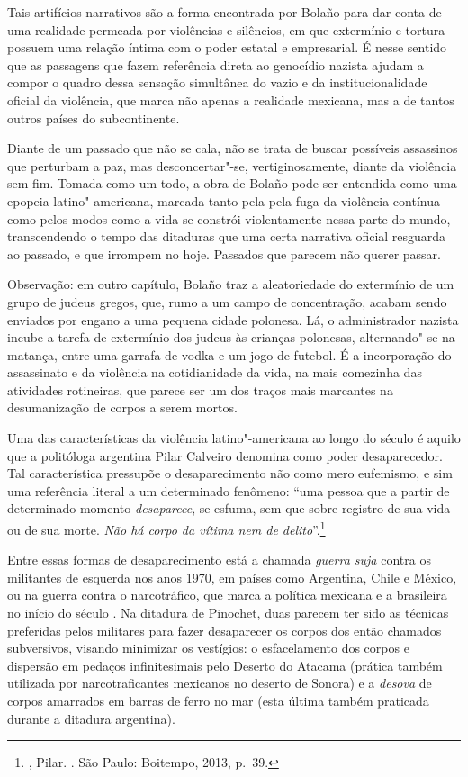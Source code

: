 Tais artifícios narrativos são a forma encontrada por Bolaño para dar
conta de uma realidade permeada por violências e silêncios, em que
extermínio e tortura possuem uma relação íntima com o poder estatal e
empresarial. É nesse sentido que as passagens que fazem referência
direta ao genocídio nazista ajudam a compor o quadro dessa sensação
simultânea do vazio e da institucionalidade oficial da violência, que
marca não apenas a realidade mexicana, mas a de tantos outros países do
subcontinente.

Diante de um passado que não se cala, não se trata de buscar possíveis
assassinos que perturbam a paz, mas desconcertar"-se, vertiginosamente,
diante da violência sem fim. Tomada como um todo, a obra de Bolaño pode
ser entendida como uma epopeia latino"-americana, marcada tanto pela pela
fuga da violência contínua como pelos modos como a vida se constrói
violentamente nessa parte do mundo, transcendendo o tempo das ditaduras
que uma certa narrativa oficial resguarda ao passado, e que irrompem no
hoje. Passados que parecem não querer passar.

Observação: em outro capítulo, Bolaño traz a aleatoriedade do extermínio
de um grupo de judeus gregos, que, rumo a um campo de concentração,
acabam sendo enviados por engano a uma pequena cidade polonesa. Lá, o
administrador nazista incube a tarefa de extermínio dos judeus às
crianças polonesas, alternando"-se na matança, entre uma garrafa de vodka
e um jogo de futebol. É a incorporação do assassinato e da violência na
cotidianidade da vida, na mais comezinha das atividades rotineiras, que
parece ser um dos traços mais marcantes na desumanização de corpos a
serem mortos.

\asterisc

Uma das características da violência latino"-americana ao longo do século
 é aquilo que a politóloga argentina Pilar Calveiro denomina como
poder desaparecedor. Tal característica pressupõe o desaparecimento não
como mero eufemismo, e sim uma referência literal a um determinado
fenômeno: ``uma pessoa que a partir de determinado momento
\emph{desaparece}, se esfuma, sem que sobre registro de sua vida ou de
sua morte. \emph{Não há corpo da vítima nem de delito}''.\footnote{,
  Pilar. {}. São Paulo: Boitempo, 2013, p.~39.}

Entre essas formas de desaparecimento está a chamada \emph{guerra suja} contra
os militantes de esquerda nos anos 1970, em países como Argentina, Chile
e México, ou na guerra contra o narcotráfico, que marca a política
mexicana e a brasileira no início do século . Na ditadura de
Pinochet, duas parecem ter sido as técnicas preferidas pelos militares
para fazer desaparecer os corpos dos então chamados subversivos, visando
minimizar os vestígios: o esfacelamento dos corpos e dispersão em
pedaços infinitesimais pelo Deserto do Atacama (prática também utilizada
por narcotraficantes mexicanos no deserto de Sonora) e a \emph{desova}
de corpos amarrados em barras de ferro no mar (esta última também
praticada durante a ditadura argentina).

